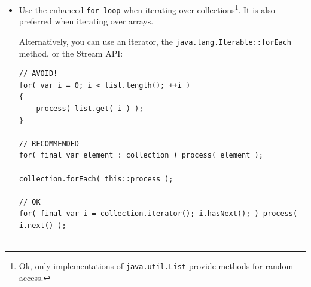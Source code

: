 \documentclass[11pt,a4paper, titlepage, parskip=half, headsepline, footsepline, cleardoublepage=current, headheight=1cm]{scrbook}
\newcommand*{\tqvref}[1]{\hyperref[{#1}]{\ref*{#1}} on page \pageref{#1}}
\begin{document}
\begin{itemize}
{For method arguments and return values, you should use the interfaces \lstinline|java.util.List|\autocite{ORACLE_DOC_LIST_INTERFACE} instead of \lstinline|Vector|, and \lstinline|java.util.Map|\autocite{ORACLE_DOC_MAP_INTERFACE} instead of \lstinline|Hashtable|. Refer also to chapter \tqvref{sec:TypeOfArgumentsAndReturnValues} that elaborates further on this topic.

If you need an implementation of the \lstinline|List| interface, you should prefer \lstinline|java.util.ArrayList|\autocite{ORACLE_DOC_ARRAYLIST_CLASS} over \lstinline|java.util.LinkedList|\autocite{ORACLE_DOC_LINKEDLIST_CLASS}. The latter is only more performant in some very rare cases, and it also has a bigger memory footprint\footnote{Internally, an \lstinline|ArrayList| uses an array for the entries, and when this gets too small, a new array with twice the size will be allocated. This means that for some time two large array will exist. For really, really large lists, this may cause an issue. In the opposite, a \lstinline|LinkedList| will grow entry by entry.}.

Instead of \lstinline|Hashtable|, you should use \lstinline|java.util.HashMap|\autocite{ORACLE_DOC_HASHMAP_CLASS} as the implementation for the \lstinline|Map| interface.

If you really need a synchronised list, you can still consider to use \lstinline|Vector| as your implementation of \lstinline|List|, but for a syncronised implementation of \lstinline|Map|, you should take \lstinline|java.util.concurrent.ConcurrentHashMap|\autocite{ORACLE_DOC_CONCURRENTHASHMAP_CLASS}.}

\item{Use the enhanced \lstinline|for-loop| when iterating over collections\footnote{Ok, only implementations of \lstinline|java.util.List|\autocite{ORACLE_DOC_LIST_INTERFACE} provide methods for random access.}. It is also preferred when iterating over arrays.

Alternatively, you can use an iterator, the \lstinline|java.lang.Iterable::forEach| method, or the Stream API:
\begin{lstlisting}
// AVOID!
for( var i = 0; i < list.length(); ++i )
{
    process( list.get( i ) );
}

// RECOMMENDED
for( final var element : collection ) process( element );

collection.forEach( this::process );

// OK
for( final var i = collection.iterator(); i.hasNext(); ) process( i.next() );


\end{lstlisting}}
\end{itemize}
\end{document}

